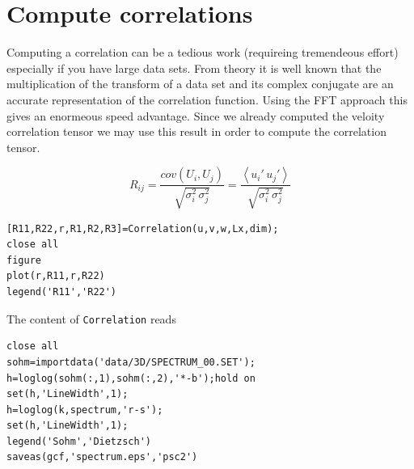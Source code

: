 \documentclass[preprint,12pt,ntfdMod]{elsarticle}
\begin{document}
\section{Compute correlations}

\begin{par}
Computing a correlation can be a tedious work (requireing tremendeous effort) especially if you have large data sets. From theory it is well known that the multiplication of the transform of a data set and its complex conjugate are an accurate representation of the correlation function. Using the FFT approach this gives an enormeous speed advantage. Since we already computed the veloity correlation tensor we may use this result in order to compute the correlation tensor.
\end{par} \vspace{1em}
\begin{par}

  \begin{equation}
      R_{ij} = \frac{cov(U_i,U_j)}{\sqrt{\sigma_i^2\,\sigma_j^2}}
             = \frac{\left<u_i'\,u_j'\right>}{\sqrt{\sigma_i^2\,\sigma_j^2}}
  \end{equation}

\end{par} \vspace{1em}
\begin{lstlisting}
[R11,R22,r,R1,R2,R3]=Correlation(u,v,w,Lx,dim);
close all
figure
plot(r,R11,r,R22)
legend('R11','R22')
\end{lstlisting}
\begin{par}

The content of \verb|Correlation| reads


\end{par} \vspace{1em}
\begin{lstlisting}
close all
sohm=importdata('data/3D/SPECTRUM_00.SET');
h=loglog(sohm(:,1),sohm(:,2),'*-b');hold on
set(h,'LineWidth',1);
h=loglog(k,spectrum,'r-s');
set(h,'LineWidth',1);
legend('Sohm','Dietzsch')
saveas(gcf,'spectrum.eps','psc2')
\end{lstlisting}
\end{document}
